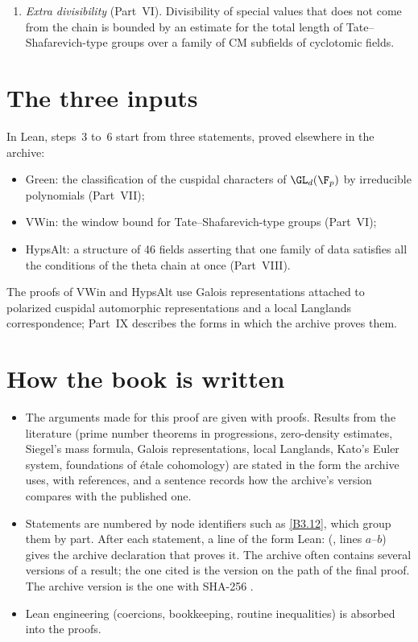 \begin{enumerate}
\item \emph{Extra divisibility} (Part~VI). Divisibility of special values that does not come from the chain is bounded by an estimate for the total length of Tate--Shafarevich-type groups over a family of CM subfields of cyclotomic fields.
\end{enumerate}

\section*{The three inputs}

In Lean, steps~3 to~6 start from three statements, proved elsewhere in the archive:
\begin{itemize}
\item \textsf{Green}: the classification of the cuspidal characters of $\GL_d(\F_p)$ by irreducible polynomials (Part~VII);
\item \textsf{VWin}: the window bound for Tate--Shafarevich-type groups (Part~VI);
\item \textsf{HypsAlt}: a structure of 46 fields asserting that one family of data satisfies all the conditions of the theta chain at once (Part~VIII).
\end{itemize}
The proofs of \textsf{VWin} and \textsf{HypsAlt} use Galois representations attached to polarized cuspidal automorphic representations and a local Langlands correspondence; Part~IX describes the forms in which the archive proves them.

\section*{How the book is written}

\begin{itemize}
\item The arguments made for this proof are given with proofs. Results from the literature (prime number theorems in progressions, zero-density estimates, Siegel's mass formula, Galois representations, local Langlands, Kato's Euler system, foundations of étale cohomology) are stated in the form the archive uses, with references, and a sentence records how the archive's version compares with the published one.
\item Statements are numbered by node identifiers such as \ref{B3.12}, which group them by part. After each statement, a line of the form \textsf{Lean:}  (, lines $a$--$b$) gives the archive declaration that proves it. The archive often contains several versions of a result; the one cited is the version on the path of the final proof. The archive version is the one with SHA-256 .
\item Lean engineering (coercions, bookkeeping, routine inequalities) is absorbed into the proofs.
\end{itemize}

